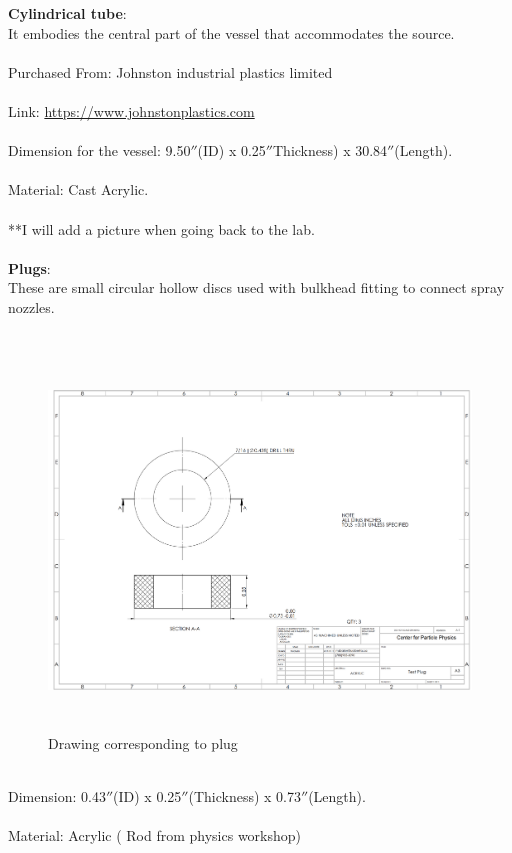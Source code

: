 \textbf{Cylindrical tube}: \\
It embodies the central part of the vessel that accommodates the source.\\
\\
Purchased From: Johnston industrial plastics limited\\
\\
Link:  \url{https://www.johnstonplastics.com}\\
\\
Dimension for the vessel: 9.50$''$(ID) x 0.25$''$Thickness) x 30.84$''$(Length).\\
\\
Material: Cast Acrylic.\\
\\
**I will add a picture when going back to the lab.\\
\\
\textbf{Plugs}:\\
These are small circular hollow discs used with bulkhead fitting to connect spray nozzles.\\
\\
\begin{figure}[!htpb]
  \centering
  \includegraphics[width = 12cm, height=10cm ]{figures/plug}
  \caption{Drawing corresponding to plug}
  \label{fig:plug}
\end{figure}
\\
Dimension: 0.43$''$(ID) x 0.25$''$(Thickness) x 0.73$''$(Length).\\
\\
Material: Acrylic ( Rod from physics workshop)\\
